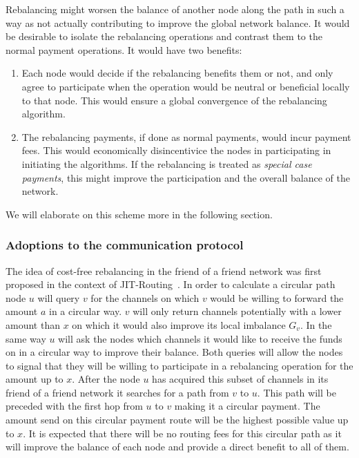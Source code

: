 \documentclass[a4paper]{paper}
\begin{document}
Rebalancing might worsen the balance of another node along the path in such a way as not actually contributing to improve the global network balance. 
It would be desirable to isolate the rebalancing operations and contrast them to the normal payment operations. 
It would have two benefits:
\begin{enumerate} 
  \item Each node would decide if the rebalancing benefits them or not, and only agree to participate when the operation would be neutral or beneficial locally to that node. 
  This would ensure a global convergence of the rebalancing algorithm.
  \item The rebalancing payments, if done as normal payments, would incur payment fees. 
  This would economically disincentivice the nodes in participating in initiating the algorithms. 
  If the rebalancing is treated as {\em special case payments}, 
  this might improve the participation and the overall balance of the network. 
\end{enumerate}

We will elaborate on this scheme more in the following section.



\subsubsection{Adoptions to the communication protocol}
\label{sec:lnchanges}

The idea of cost-free rebalancing in the friend of a friend network was first proposed in the context of JIT-Routing~\cite{pickhardt2019jit}.
In order to calculate a circular path node $u$ will query $v$ for the channels on which $v$ would be willing to forward the amount $a$ in a circular way.
$v$ will only return channels potentially with a lower amount than $x$ on which it would also improve its local imbalance $G_{v}$.
In the same way $u$ will ask the nodes which channels it would like to receive the funds on in a circular way to improve their balance.
Both queries will allow the nodes to signal that they will be willing to participate in a rebalancing operation for the amount up to $x$.
After the node $u$ has acquired this subset of channels in its friend of a friend network it searches for a path from $v$ to $u$.
This path will be preceded with the first hop from $u$ to $v$ making it a circular payment.
The amount send on this circular payment route will be the highest possible value up to $x$.
It is expected that there will be no routing fees for this circular path as it will improve the balance of each node and provide a direct benefit to all of them.
\end{document}

